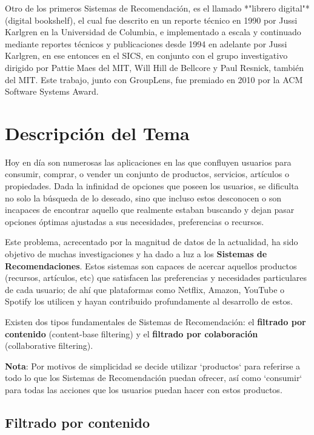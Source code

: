 \documentclass[14pt]{extarticle}
\begin{document}
Otro de los primeros Sistemas de Recomendación, es el llamado *"librero digital"* (digital bookshelf), el cual fue descrito en un reporte técnico en 1990 por Jussi Karlgren en la Universidad de Columbia, e implementado a escala y continuado mediante reportes técnicos y publicaciones desde 1994 en adelante por Jussi Karlgren, en ese entonces en el SICS, en conjunto con el grupo investigativo dirigido por Pattie Maes del MIT, Will Hill de Bellcore y Paul Resnick, también del MIT. Este trabajo, junto con GroupLens, fue premiado en 2010 por la ACM Software Systems Award.

\section{Descripción del Tema}

Hoy en día son numerosas las aplicaciones en las que confluyen usuarios para consumir, comprar, o vender un conjunto de productos, servicios, artículos o propiedades. Dada la infinidad de opciones que poseen los usuarios, se dificulta no solo la búsqueda de lo deseado, sino que incluso estos desconocen o son incapaces de encontrar aquello que realmente estaban buscando y dejan pasar opciones óptimas ajustadas a sus necesidades, preferencias o recursos.

Este problema, acrecentado por la magnitud de datos de la actualidad, ha sido objetivo de muchas investigaciones y ha dado a luz a los \textbf{Sistemas de Recomendaciones}. Estos sistemas son capaces de acercar aquellos productos (recursos, artículos, etc) que satisfacen las preferencias y necesidades particulares de cada usuario; de ahí que plataformas como Netflix, Amazon, YouTube o Spotify los utilicen y hayan contribuido profundamente al desarrollo de estos.

Existen dos tipos fundamentales de Sistemas de Recomendación: el \textbf{filtrado por contenido} (content-base filtering) y el \textbf{filtrado por colaboración} (collaborative filtering).

\textbf{Nota}: Por motivos de simplicidad se decide utilizar `productos` para referirse a todo lo que los Sistemas de Recomendación puedan ofrecer, así como `consumir` para todas las acciones que los usuarios puedan hacer con estos productos.

\subsection{Filtrado por contenido}
\end{document}
